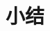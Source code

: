 \documentclass[UTF8]{article}
\begin{document}
\section{小结}

\ifx\wholebook\relax \else






\expandafter\enddocument

\fi
\end{document}
